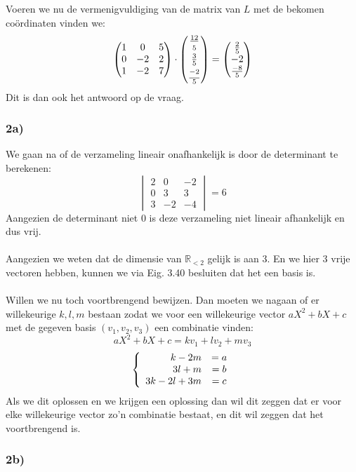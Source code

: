 \documentclass[lineaire_algebra_oplossingen.tex]{subfiles}
\begin{document}
Voeren we nu de vermenigvuldiging van de matrix van $L$ met de bekomen co\"ordinaten vinden we:\\
$$
\begin{pmatrix}
1&0&5\\
0&-2&2\\
1&-2&7
\end{pmatrix}
\cdot
\begin{pmatrix}
\frac{12}{\strut5}\\ \frac{3}{5}\\ \frac{\strut -2}{5}
\end{pmatrix}
=
\begin{pmatrix}
\strut \frac{2}{5}\\ -2\\ \strut \frac{-8}{5}
\end{pmatrix}
$$
Dit is dan ook het antwoord op de vraag.
\subsubsection*{2a)}
We gaan na of de verzameling lineair onafhankelijk is door de determinant te berekenen:
$$
\begin{vmatrix}
2 & 0 & -2\\
0&3&3\\
3&-2&-4
\end{vmatrix}
= 6
$$
Aangezien de determinant niet 0 is deze verzameling niet lineair afhankelijk en dus vrij.
\\
\\
Aangezien we weten dat de dimensie van $\mathbb{R}_{<2}$ gelijk is aan 3. En we hier 3 vrije vectoren hebben, kunnen we via Eig. 3.40 besluiten dat het een basis is.
\\
\\
Willen we nu toch voortbrengend bewijzen. Dan moeten we nagaan of er willekeurige $k,l,m$ bestaan zodat we voor een willekeurige vector $aX^2+bX+c$ met de gegeven basis $(v_1,v_2,v_3)$ een combinatie vinden:
$$
aX^2+bX+c = kv_1+lv_2+mv_3
$$
$$
\left\lbrace
\begin{array}{r c}
k-2m &= a\\
3l+m &= b\\
3k-2l+3m &= c
\end{array}
\right.
$$
Als we dit oplossen en we krijgen een oplossing dan wil dit zeggen dat er voor elke willekeurige vector zo'n combinatie bestaat, en dit wil zeggen dat het voortbrengend is.
\subsubsection*{2b)}
\end{document}
